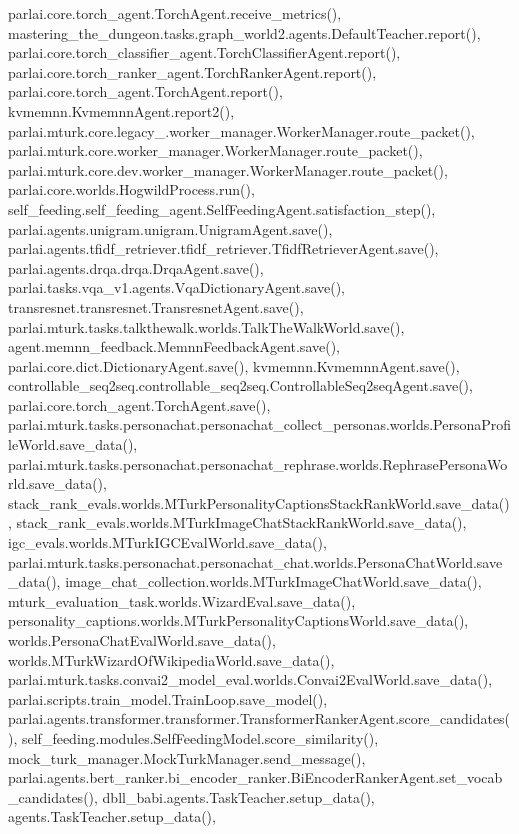 parlai.\+core.\+torch\+\_\+agent.\+Torch\+Agent.\+receive\+\_\+metrics(), mastering\+\_\+the\+\_\+dungeon.\+tasks.\+graph\+\_\+world2.\+agents.\+Default\+Teacher.\+report(), parlai.\+core.\+torch\+\_\+classifier\+\_\+agent.\+Torch\+Classifier\+Agent.\+report(), parlai.\+core.\+torch\+\_\+ranker\+\_\+agent.\+Torch\+Ranker\+Agent.\+report(), parlai.\+core.\+torch\+\_\+agent.\+Torch\+Agent.\+report(), kvmemnn.\+Kvmemnn\+Agent.\+report2(), parlai.\+mturk.\+core.\+legacy\+\_.\+worker\+\_\+manager.\+Worker\+Manager.\+route\+\_\+packet(), parlai.\+mturk.\+core.\+worker\+\_\+manager.\+Worker\+Manager.\+route\+\_\+packet(), parlai.\+mturk.\+core.\+dev.\+worker\+\_\+manager.\+Worker\+Manager.\+route\+\_\+packet(), parlai.\+core.\+worlds.\+Hogwild\+Process.\+run(), self\+\_\+feeding.\+self\+\_\+feeding\+\_\+agent.\+Self\+Feeding\+Agent.\+satisfaction\+\_\+step(), parlai.\+agents.\+unigram.\+unigram.\+Unigram\+Agent.\+save(), parlai.\+agents.\+tfidf\+\_\+retriever.\+tfidf\+\_\+retriever.\+Tfidf\+Retriever\+Agent.\+save(), parlai.\+agents.\+drqa.\+drqa.\+Drqa\+Agent.\+save(), parlai.\+tasks.\+vqa\+\_\+v1.\+agents.\+Vqa\+Dictionary\+Agent.\+save(), transresnet.\+transresnet.\+Transresnet\+Agent.\+save(), parlai.\+mturk.\+tasks.\+talkthewalk.\+worlds.\+Talk\+The\+Walk\+World.\+save(), agent.\+memnn\+\_\+feedback.\+Memnn\+Feedback\+Agent.\+save(), parlai.\+core.\+dict.\+Dictionary\+Agent.\+save(), kvmemnn.\+Kvmemnn\+Agent.\+save(), controllable\+\_\+seq2seq.\+controllable\+\_\+seq2seq.\+Controllable\+Seq2seq\+Agent.\+save(), parlai.\+core.\+torch\+\_\+agent.\+Torch\+Agent.\+save(), parlai.\+mturk.\+tasks.\+personachat.\+personachat\+\_\+collect\+\_\+personas.\+worlds.\+Persona\+Profile\+World.\+save\+\_\+data(), parlai.\+mturk.\+tasks.\+personachat.\+personachat\+\_\+rephrase.\+worlds.\+Rephrase\+Persona\+World.\+save\+\_\+data(), stack\+\_\+rank\+\_\+evals.\+worlds.\+M\+Turk\+Personality\+Captions\+Stack\+Rank\+World.\+save\+\_\+data(), stack\+\_\+rank\+\_\+evals.\+worlds.\+M\+Turk\+Image\+Chat\+Stack\+Rank\+World.\+save\+\_\+data(), igc\+\_\+evals.\+worlds.\+M\+Turk\+I\+G\+C\+Eval\+World.\+save\+\_\+data(), parlai.\+mturk.\+tasks.\+personachat.\+personachat\+\_\+chat.\+worlds.\+Persona\+Chat\+World.\+save\+\_\+data(), image\+\_\+chat\+\_\+collection.\+worlds.\+M\+Turk\+Image\+Chat\+World.\+save\+\_\+data(), mturk\+\_\+evaluation\+\_\+task.\+worlds.\+Wizard\+Eval.\+save\+\_\+data(), personality\+\_\+captions.\+worlds.\+M\+Turk\+Personality\+Captions\+World.\+save\+\_\+data(), worlds.\+Persona\+Chat\+Eval\+World.\+save\+\_\+data(), worlds.\+M\+Turk\+Wizard\+Of\+Wikipedia\+World.\+save\+\_\+data(), parlai.\+mturk.\+tasks.\+convai2\+\_\+model\+\_\+eval.\+worlds.\+Convai2\+Eval\+World.\+save\+\_\+data(), parlai.\+scripts.\+train\+\_\+model.\+Train\+Loop.\+save\+\_\+model(), parlai.\+agents.\+transformer.\+transformer.\+Transformer\+Ranker\+Agent.\+score\+\_\+candidates(), self\+\_\+feeding.\+modules.\+Self\+Feeding\+Model.\+score\+\_\+similarity(), mock\+\_\+turk\+\_\+manager.\+Mock\+Turk\+Manager.\+send\+\_\+message(), parlai.\+agents.\+bert\+\_\+ranker.\+bi\+\_\+encoder\+\_\+ranker.\+Bi\+Encoder\+Ranker\+Agent.\+set\+\_\+vocab\+\_\+candidates(), dbll\+\_\+babi.\+agents.\+Task\+Teacher.\+setup\+\_\+data(), agents.\+Task\+Teacher.\+setup\+\_\+data(), 